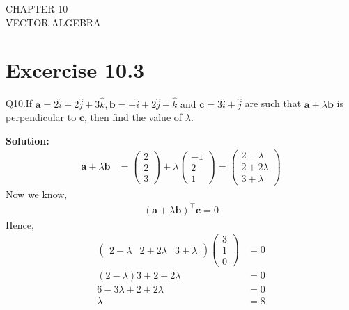 \documentclass[12pt]{article}
\newcommand{\solution}{\noindent \textbf{Solution: }}
\newcommand{\myvec}[1]{\ensuremath{\begin{pmatrix}#1\end{pmatrix}}}
\let\vec\mathbf
\begin{document}
\begin{center}
\textbf\large{CHAPTER-10 \\ VECTOR ALGEBRA}

\end{center}
\section*{Excercise 10.3}

Q10.If $\vec{a} = 2\hat{i}+2\hat{j}+3\hat{k}, \vec{b} = -\hat{i}+2\hat{j}+\hat{k} \text{ and } \vec{c} = 3\hat{i}+\hat{j}$ are such that $\vec{a}+\lambda \vec{b}$ is perpendicular to $\vec{c}$, then find the value of $\lambda$.

\solution 
\begin{align}
	\vec{a}+\lambda \vec{b}&=\myvec{2\\2\\3} + \lambda \myvec{-1\\2\\1}=\myvec{2-\lambda\\2+2\lambda\\3+\lambda}
\end{align}
Now we know,
\begin{align}
	(\vec{a}+\lambda \vec{b})^{\top} \vec{c} = 0
\end{align}
Hence,
\begin{align}
	\myvec{2-\lambda & 2+2\lambda & 3+\lambda} \myvec{3\\1\\0} &= 0\\
	(2-\lambda)3 + 2+2\lambda &= 0\\
	6-3\lambda + 2 + 2\lambda &= 0\\
	\lambda &= 8
\end{align}
\end{document}
